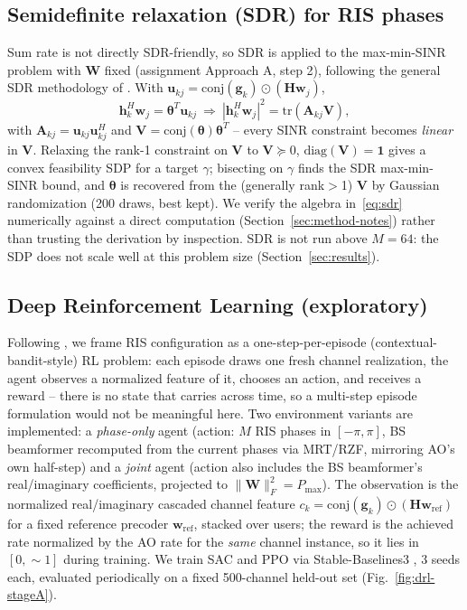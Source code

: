 \documentclass[conference]{IEEEtran}
\newcommand{\IRS}{RIS}
\begin{document}
\subsection{Semidefinite relaxation (SDR) for RIS phases}
Sum rate is not directly SDR-friendly, so SDR is applied to the
max-min-SINR problem with $\mathbf{W}$ fixed (assignment Approach A,
step 2), following the general SDR methodology of \cite{luo2010sdr}.
With $\mathbf{u}_{kj} = \mathrm{conj}(\mathbf{g}_k)\odot(\mathbf{H}\mathbf{w}_j)$,
\begin{equation}
\mathbf{h}_k^H\mathbf{w}_j = \boldsymbol{\theta}^T\mathbf{u}_{kj}
\ \Rightarrow\
|\mathbf{h}_k^H\mathbf{w}_j|^2 = \mathrm{tr}(\mathbf{A}_{kj}\mathbf{V}),
\label{eq:sdr}
\end{equation}
with $\mathbf{A}_{kj}=\mathbf{u}_{kj}\mathbf{u}_{kj}^H$ and
$\mathbf{V}=\mathrm{conj}(\boldsymbol{\theta})\boldsymbol{\theta}^T$ --
every SINR constraint becomes \emph{linear} in $\mathbf{V}$. Relaxing
the rank-1 constraint on $\mathbf{V}$ to $\mathbf{V}\succeq 0$,
$\mathrm{diag}(\mathbf{V}){=}\mathbf{1}$ gives a convex feasibility SDP
for a target $\gamma$; bisecting on $\gamma$ finds the SDR max-min-SINR
bound, and $\boldsymbol{\theta}$ is recovered from the (generally
rank$>$1) $\mathbf{V}$ by Gaussian randomization (200 draws, best kept).
We verify the algebra in~\eqref{eq:sdr} numerically against a direct
computation (Section~\ref{sec:method-notes}) rather than trusting the
derivation by inspection. SDR is not run above $M{=}64$: the SDP does
not scale well at this problem size (Section~\ref{sec:results}).

\subsection{Deep Reinforcement Learning (exploratory)}
Following \cite{huang2020drl}, we frame \IRS{} configuration as a
one-step-per-episode (contextual-bandit-style) RL problem: each episode
draws one fresh channel realization, the agent observes a normalized
feature of it, chooses an action, and receives a reward -- there is no
state that carries across time, so a multi-step episode formulation
would not be meaningful here. Two environment variants are implemented:
a \emph{phase-only} agent (action: $M$ \IRS{} phases in $[-\pi,\pi]$,
BS beamformer recomputed from the current phases via MRT/RZF, mirroring
AO's own half-step) and a \emph{joint} agent (action also includes the
BS beamformer's real/imaginary coefficients, projected to
$\|\mathbf{W}\|_F^2{=}P_{\max}$). The observation is the normalized
real/imaginary cascaded channel feature
$c_k=\mathrm{conj}(\mathbf{g}_k)\odot(\mathbf{H}\mathbf{w}_{\mathrm{ref}})$
for a fixed reference precoder $\mathbf{w}_{\mathrm{ref}}$, stacked over
users; the reward is the achieved rate normalized by the AO rate for the
\emph{same} channel instance, so it lies in $[0,{\sim}1]$ during
training. We train SAC \cite{haarnoja2018sac} and PPO
\cite{schulman2017ppo} via Stable-Baselines3 \cite{raffin2021sb3}, 3
seeds each, evaluated periodically on a fixed 500-channel held-out set
(Fig.~\ref{fig:drl-stageA}).
\end{document}
